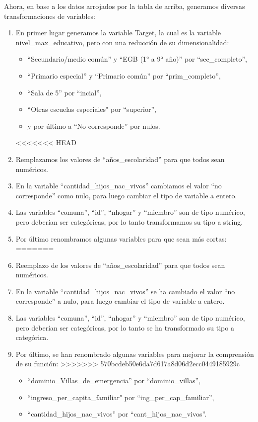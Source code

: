 \documentclass[a4paper]{article}
\begin{document}
    Ahora, en base a los datos arrojados por la tabla de arriba, generamos diversas transformaciones de variables:
    \begin{enumerate}
        \item En primer lugar generamos la variable Target, la cual es la variable nivel\_max\_educativo, pero con una reducción de su dimensionalidad:
            \begin{itemize}
                \item ``Secundario/medio común'' y ``EGB (1° a 9° año)'' por ``sec\_completo'',
                \item ``Primario especial'' y ``Primario común'' por ``prim\_completo'',
                \item ``Sala de 5'' por ``incial'',
                \item ``Otras escuelas especiales" por ``superior'',
                \item y por último a ``No corresponde'' por nulos.
            \end{itemize}
<<<<<<< HEAD
        \item Remplazamos los valores de ``años\_escolaridad'' para que todos sean numéricos.
        \item En la variable ``cantidad\_hijos\_nac\_vivos'' cambiamos el valor ``no corresponde'' como nulo, para luego cambiar el tipo de variable a entero.
        \item Las variables ``comuna'', ``id'', ``nhogar'' y ``miembro'' son de tipo numérico, pero deberían ser categóricas, por lo tanto transformamos su tipo a string.
        \item Por último renombramos algunas variables para que sean más cortas:
=======
        \item Reemplazo de los valores de ``años\_escolaridad'' para que todos sean numéricos.
        \item En la variable ``cantidad\_hijos\_nac\_vivos'' se ha cambiado el valor ``no corresponde'' a nulo, para luego cambiar el tipo de variable a entero.
        \item Las variables ``comuna'', ``id'', ``nhogar'' y ``miembro'' son de tipo numérico, pero deberían ser categóricas, por lo tanto se ha transformado su tipo a categórica.
        \item Por último, se han renombrado algunas variables para mejorar la comprensión de su función:
>>>>>>> 570bcdeb50e6da7d617a8d06d2ecc0449185929c
            \begin{itemize}
                \item ``dominio\_Villas\_de\_emergencia'' por ``dominio\_villas'',
                \item ``ingreso\_per\_capita\_familiar" por ``ing\_per\_cap\_familiar'',
                \item ``cantidad\_hijos\_nac\_vivos'' por ``cant\_hijos\_nac\_vivos''.
            \end{itemize}
    \end{enumerate}
\end{document}
